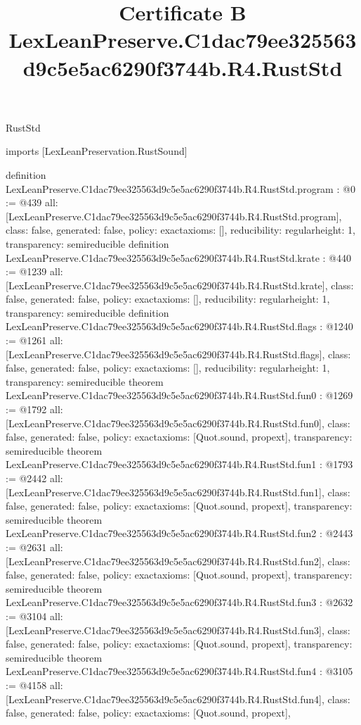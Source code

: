 \begin{lexlean}{RustStd}
\title{Certificate B LexLeanPreserve.C1dac79ee325563d9c5e5ac6290f3744b.R4.RustStd}
\begin{coremodule}
imports [LexLeanPreservation.RustSound]

definition LexLeanPreserve.C1dac79ee325563d9c5e5ac6290f3744b.R4.RustStd.program : @0 := @439 {
  all: [LexLeanPreserve.C1dac79ee325563d9c5e5ac6290f3744b.R4.RustStd.program],
  class: false,
  generated: false,
  policy: exact{axioms: []},
  reducibility: regular{height: 1},
  transparency: semireducible
}
definition LexLeanPreserve.C1dac79ee325563d9c5e5ac6290f3744b.R4.RustStd.krate : @440 := @1239 {
  all: [LexLeanPreserve.C1dac79ee325563d9c5e5ac6290f3744b.R4.RustStd.krate],
  class: false,
  generated: false,
  policy: exact{axioms: []},
  reducibility: regular{height: 1},
  transparency: semireducible
}
definition LexLeanPreserve.C1dac79ee325563d9c5e5ac6290f3744b.R4.RustStd.flags : @1240 := @1261 {
  all: [LexLeanPreserve.C1dac79ee325563d9c5e5ac6290f3744b.R4.RustStd.flags],
  class: false,
  generated: false,
  policy: exact{axioms: []},
  reducibility: regular{height: 1},
  transparency: semireducible
}
theorem LexLeanPreserve.C1dac79ee325563d9c5e5ac6290f3744b.R4.RustStd.fun0 : @1269 := @1792 {
  all: [LexLeanPreserve.C1dac79ee325563d9c5e5ac6290f3744b.R4.RustStd.fun0],
  class: false,
  generated: false,
  policy: exact{axioms: [Quot.sound, propext]},
  transparency: semireducible
}
theorem LexLeanPreserve.C1dac79ee325563d9c5e5ac6290f3744b.R4.RustStd.fun1 : @1793 := @2442 {
  all: [LexLeanPreserve.C1dac79ee325563d9c5e5ac6290f3744b.R4.RustStd.fun1],
  class: false,
  generated: false,
  policy: exact{axioms: [Quot.sound, propext]},
  transparency: semireducible
}
theorem LexLeanPreserve.C1dac79ee325563d9c5e5ac6290f3744b.R4.RustStd.fun2 : @2443 := @2631 {
  all: [LexLeanPreserve.C1dac79ee325563d9c5e5ac6290f3744b.R4.RustStd.fun2],
  class: false,
  generated: false,
  policy: exact{axioms: [Quot.sound, propext]},
  transparency: semireducible
}
theorem LexLeanPreserve.C1dac79ee325563d9c5e5ac6290f3744b.R4.RustStd.fun3 : @2632 := @3104 {
  all: [LexLeanPreserve.C1dac79ee325563d9c5e5ac6290f3744b.R4.RustStd.fun3],
  class: false,
  generated: false,
  policy: exact{axioms: [Quot.sound, propext]},
  transparency: semireducible
}
theorem LexLeanPreserve.C1dac79ee325563d9c5e5ac6290f3744b.R4.RustStd.fun4 : @3105 := @4158 {
  all: [LexLeanPreserve.C1dac79ee325563d9c5e5ac6290f3744b.R4.RustStd.fun4],
  class: false,
  generated: false,
  policy: exact{axioms: [Quot.sound, propext]},
}
\end{coremodule}
\end{lexlean}
